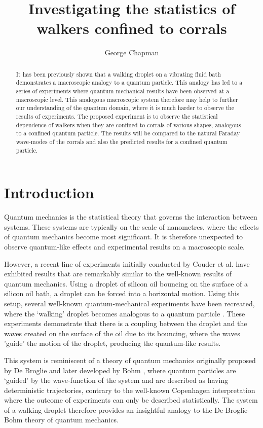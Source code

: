 \documentclass[11pt]{article}
\author{George Chapman}
\title{Investigating the statistics of walkers confined to corrals}
\begin{document}
\maketitle

\begin{abstract}
It has been previously shown that a walking droplet on a vibrating fluid bath demonstrates a macroscopic analogy to a quantum particle.  This analogy has led to a series of experiments where quantum mechanical results have been observed at a macroscopic level.  This analogous macroscopic system therefore may help to further our understanding of the quantum domain, where it is much harder to observe the results of experiments.  The proposed experiment is to observe the statistical dependence of walkers when they are confined to corrals of various shapes, analogous to a confined quantum particle.  The results will be compared to the natural Faraday wave-modes of the corrals and also the predicted results for a confined quantum particle.
\end{abstract}

\section{Introduction}
\label{sec:introduction}

Quantum mechanics is the statistical theory that governs the interaction between systems.  These systems are typically on the scale of nanometres, where the effects of quantum mechanics become most significant.  It is therefore unexpected to observe quantum-like effects and experimental results on a macroscopic scale.

However, a recent line of experiments initially conducted by Couder et al.\cite{1} have exhibited results that are remarkably similar to the well-known results of quantum mechanics.  Using a droplet of silicon oil bouncing on the surface of a silicon oil bath, a droplet can be forced into a horizontal motion.  Using this setup, several well-known quantum-mechanical experiments have been recreated, where the `walking' droplet becomes analogous to a quantum particle \cite{1,6,7}.  These experiments demonstrate that there is a coupling between the droplet and the waves created on the surface of the oil due to its bouncing, where the waves 'guide' the motion of the droplet, producing the quantum-like results.

This system is reminiscent of a theory of quantum mechanics originally proposed by De Broglie and later developed by Bohm \cite{17}, where quantum particles are `guided' by the wave-function of the system and are described as having deterministic trajectories, contrary to the well-known Copenhagen interpretation where the outcome of experiments can only be described statistically.  The system of a walking droplet therefore provides an insightful analogy to the De Broglie-Bohm theory of quantum mechanics.
\end{document}
